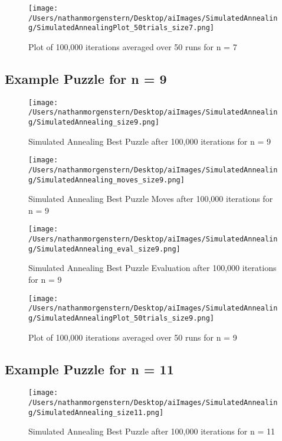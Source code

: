 \documentclass{report}
\begin{document}
	\begin{figure}[H]
	\centering
	\texttt{[image: /Users/nathanmorgenstern/Desktop/aiImages/SimulatedAnnealing/SimulatedAnnealingPlot\_50trials\_size7.png]}
	\caption{Plot of 100,000 iterations averaged over 50 runs for n = 7}
	\label{fig: Plot of 100,000 iterations averaged over 50 runs for n = 7}
	\end{figure}


\subsection{Example Puzzle for n = 9}
	
	\begin{figure}[H]
	\centering
	\texttt{[image: /Users/nathanmorgenstern/Desktop/aiImages/SimulatedAnnealing/SimulatedAnnealing\_size9.png]}
	\caption{Simulated Annealing Best Puzzle after 100,000 iterations for n = 9} 
	\label{fig: Simulated Annealing Best Puzzle after 100,000 iterations for n = 9}
	\end{figure}
	
	\begin{figure}[H]
	\centering
	\texttt{[image: /Users/nathanmorgenstern/Desktop/aiImages/SimulatedAnnealing/SimulatedAnnealing\_moves\_size9.png]}
	\caption{Simulated Annealing Best Puzzle Moves after 100,000 iterations for n = 9} 
	\label{fig: Simulated Annealing Best Puzzle Moves after 100,000 iterations for n = 9}
	\end{figure}

	\begin{figure}[H]
	\centering
	\texttt{[image: /Users/nathanmorgenstern/Desktop/aiImages/SimulatedAnnealing/SimulatedAnnealing\_eval\_size9.png]}
	\caption{Simulated Annealing Best Puzzle Evaluation after 100,000 iterations for n = 9} 
	\label{fig: Simulated Annealing Best Puzzle Evaluation after 100,000 iterations for n = 9} 
	\end{figure}

	\begin{figure}[H]
	\centering
	\texttt{[image: /Users/nathanmorgenstern/Desktop/aiImages/SimulatedAnnealing/SimulatedAnnealingPlot\_50trials\_size9.png]}
	\caption{Plot of 100,000 iterations averaged over 50 runs for n = 9}
	\label{fig: Plot of 100,000 iterations averaged over 50 runs for n = 9}
	\end{figure}

\subsection{Example Puzzle for n = 11}
	\begin{figure}[H]
	\centering
	\texttt{[image: /Users/nathanmorgenstern/Desktop/aiImages/SimulatedAnnealing/SimulatedAnnealing\_size11.png]}
	\caption{Simulated Annealing Best Puzzle after 100,000 iterations for n = 11} 
	\label{fig: Simulated Annealing Best Puzzle after 100,000 iterations for n = 11}
	\end{figure}
	
\end{document}
